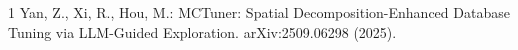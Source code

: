 \documentclass[runningheads]{llncs}
\begin{document}
\pagestyle{plain}
\raggedbottom
\setcounter{section}{2}
\label{sec:problem}

\label{ct:method-end}
\clearpage
\appendix

\begin{thebibliography}{1}
Yan, Z., Xi, R., Hou, M.: MCTuner: Spatial Decomposition-Enhanced Database Tuning via LLM-Guided Exploration. arXiv:2509.06298 (2025).
\end{thebibliography}
\end{document}
